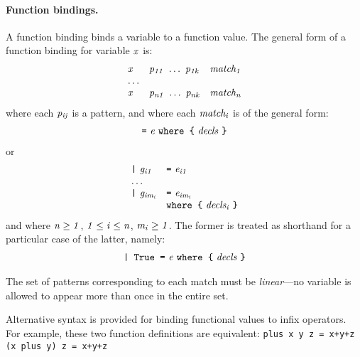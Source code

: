 \paragraph*{Function bindings.}
A function binding binds a variable to a function value.  The general
form of a function binding for variable \mbox{$\it x$} is:
\[\ba{lll}
\mbox{$\it x$} & \mbox{$\it p_{11}\ \ldots \ p_{1k}$} & \mbox{$\it match_1$}\\
\mbox{$\it \ldots $} \\
\mbox{$\it x$} & \mbox{$\it p_{n1}\ \ldots \ p_{nk}$} & \mbox{$\it match_n$}
\ea\]
where each \mbox{$\it p_{ij}$} is a pattern, and where each \mbox{$\it match_i$} is of the
general form:
\[\ba{l}
\mbox{$\it \makebox{\tt =}\ e\ \makebox{\tt where\ {\char'173}}\ decls\ \makebox{\tt {\char'175}}$}
\ea\]
or
\[\ba{lll}
\mbox{$\it \makebox{\tt |}\ g_{i1}$}   & \mbox{$\it \makebox{\tt =}\ e_{i1}$} \\
\mbox{$\it \ldots $} \\
\mbox{$\it \makebox{\tt |}\ g_{im_i}$} & \mbox{$\it \makebox{\tt =}\ e_{im_i}$} \\
               & \multicolumn{2}{l}{\mbox{$\it \makebox{\tt where\ {\char'173}}\ decls_i\ \makebox{\tt {\char'175}}$}}
\ea\]
and where \mbox{$\it n\geq 1$}, \mbox{$\it 1\leq i\leq n$}, \mbox{$\it m_i\geq 1$}.  The former is treated
as shorthand for a particular case of the latter, namely:
\[\ba{l}
\mbox{$\it \makebox{\tt |\ True\ =}\ e\ \makebox{\tt where\ {\char'173}}\ decls\ \makebox{\tt {\char'175}}$}
\ea\]

The set of patterns corresponding to each match must be {\em
linear}---no variable is allowed
to appear more than once in the entire set.

Alternative syntax is provided for binding functional values to infix
operators.  For example, these two function
definitions are equivalent:
\bprog
\mbox{\tt plus\ x\ y\ z\ =\ x+y+z}\\
\mbox{\tt (x\ }\bkqB\mbox{\tt plus}\bkqA\mbox{\tt \ y)\ z\ =\ x+y+z}
\eprogNoSkip


